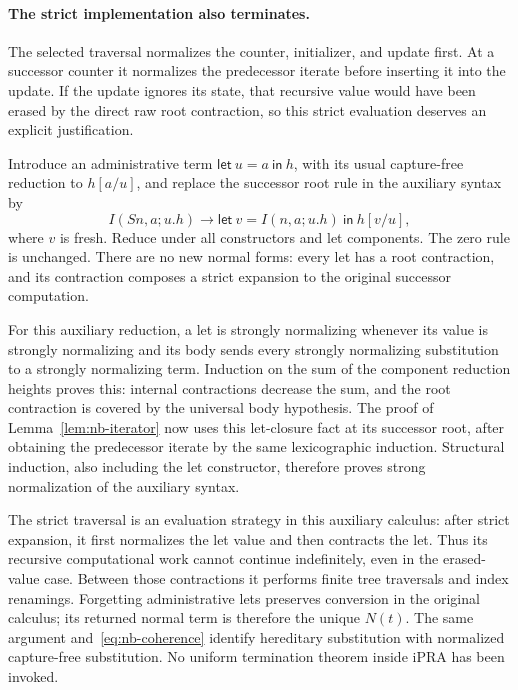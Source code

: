 \documentclass[11pt,a4paper]{article}
\theoremstyle{definition}\newtheorem{definition}[theorem]{Definition}
\theoremstyle{remark}\newtheorem{remark}[theorem]{Remark}
\begin{document}
\paragraph{The strict implementation also terminates.}
The selected traversal normalizes the counter, initializer, and update
first. At a successor counter it normalizes the predecessor iterate
before inserting it into the update. If the update ignores its state,
that recursive value would have been erased by the direct raw root
contraction, so this strict evaluation deserves an explicit justification.

Introduce an administrative term $\mathsf{let}\ u=a\ \mathsf{in}\ h$,
with its usual capture-free reduction to $h[a/u]$, and replace the
successor root rule in the auxiliary syntax by
\[
 I(Sn,a;u.h)\longrightarrow
       \mathsf{let}\ v=I(n,a;u.h)\ \mathsf{in}\ h[v/u],
 \tag{Strict expansion}
\]
where $v$ is fresh. Reduce under all constructors and let components.
The zero rule is unchanged. There are no new normal forms: every let
has a root contraction, and its contraction composes a strict expansion
to the original successor computation.

For this auxiliary reduction, a let is strongly normalizing whenever
its value is strongly normalizing and its body sends every strongly
normalizing substitution to a strongly normalizing term. Induction on
the sum of the component reduction heights proves this: internal
contractions decrease the sum, and the root contraction is covered by
the universal body hypothesis. The proof of
Lemma~\ref{lem:nb-iterator} now uses this let-closure fact at its successor
root, after obtaining the predecessor iterate by the same lexicographic
induction. Structural induction, also including the let constructor,
therefore proves strong normalization of the auxiliary syntax.

The strict traversal is an evaluation strategy in this auxiliary
calculus: after strict expansion, it first normalizes the let value and
then contracts the let. Thus its recursive computational work cannot
continue indefinitely, even in the erased-value case. Between those
contractions it performs finite tree traversals and index renamings.
Forgetting administrative lets preserves conversion in the original
calculus; its returned normal term is therefore the unique $N(t)$.
The same argument and~\eqref{eq:nb-coherence} identify hereditary
substitution with normalized capture-free substitution. No uniform
termination theorem inside iPRA has been invoked.
\end{document}
